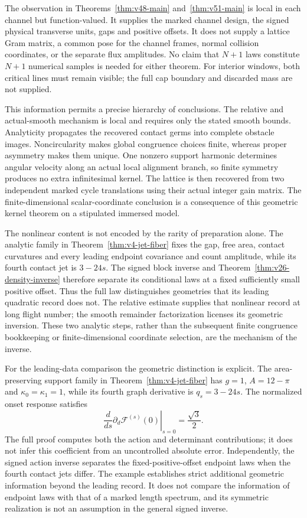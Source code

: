 The observation in Theorems~\ref{thm:v48-main} and~\ref{thm:v51-main}
is local in each channel but function-valued.  It supplies the marked
channel design, the signed physical transverse units, gaps and positive
offsets.  It does not supply a lattice Gram matrix, a common pose for
the channel frames, normal collision coordinates, or the separate flux
amplitudes.  No claim that $N+1$ laws constitute $N+1$ numerical samples
is needed for either theorem.  For interior windows, both critical
lines must remain visible; the full cap boundary and discarded mass
are not supplied.

This information permits a precise hierarchy of conclusions.  The
relative and actual-smooth mechanism is local and requires only the
stated smooth bounds.  Analyticity propagates the recovered contact
germs into complete obstacle images.  Noncircularity makes global
congruence choices finite, whereas proper asymmetry makes them unique.
One nonzero support harmonic determines angular velocity along an
actual local alignment branch, so finite symmetry produces no extra
infinitesimal kernel.  The lattice is then recovered from two independent
marked cycle translations using their actual integer gain matrix.
The finite-dimensional scalar-coordinate conclusion is a consequence
of this geometric kernel theorem on a stipulated immersed model.

The nonlinear content is not encoded by the rarity of preparation alone.
The analytic family in Theorem~\ref{thm:v4-jet-fiber} fixes the gap,
free area, contact curvatures and every leading endpoint covariance and
count amplitude, while its fourth contact jet is $3-24s$.  The signed
block inverse and Theorem~\ref{thm:v26-density-inverse} therefore
separate its conditional laws at a fixed sufficiently small positive
offset.  Thus the full law distinguishes geometries that its leading
quadratic record does not.  The relative estimate supplies that nonlinear
record at long flight number; the smooth remainder factorization licenses
its geometric inversion.  These two analytic steps, rather than the
subsequent finite congruence bookkeeping or finite-dimensional coordinate
selection, are the mechanism of the inverse.

For the leading-data comparison the geometric distinction is explicit.
The area-preserving support family in Theorem~\ref{thm:v4-jet-fiber}
has $g=1$, $A=12-\pi$ and $\kappa_0=\kappa_1=1$, while its
fourth graph derivative is $q_s=3-24s$.  The normalized onset response
satisfies
\[
 \left.\frac{d}{ds}\partial_d\mathcal F^{(s)}(0)\right|_{s=0}
                         =\frac{\sqrt3}{2}.
\]
The full proof computes both the action and determinant contributions;
it does not infer this coefficient from an uncontrolled absolute error.
Independently, the signed action inverse separates the fixed-positive-offset
endpoint laws when the fourth contact jets differ.  The example establishes
strict additional geometric information beyond the leading record.  It
does not compare the information of endpoint laws with that of a marked
length spectrum, and its symmetric realization is not an assumption in
the general signed inverse.

